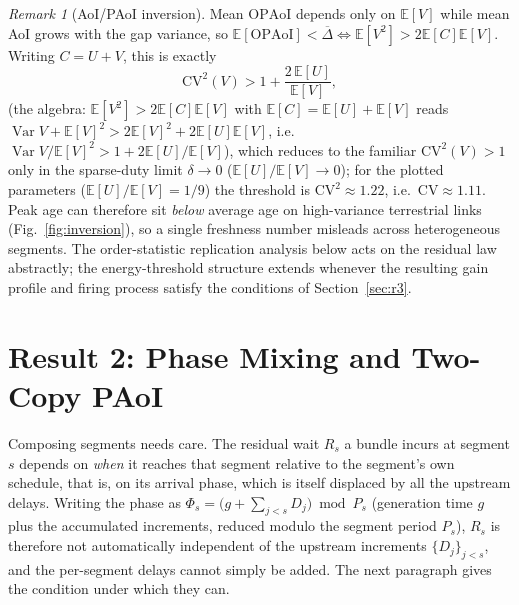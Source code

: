 \documentclass[twocolumn,3p,times,procedia]{elsarticle}
\theoremstyle{plain}
\theoremstyle{remark}
\newtheorem{remark}{Remark}
\newcommand{\AoI}{\Delta}
\newcommand{\OPAoI}{\mathrm{OPAoI}}
\newcommand{\E}{\mathbb{E}}
\begin{document}
\begin{remark}[AoI/PAoI inversion]\label{rem:inversion}
Mean $\OPAoI$ depends only on $\E[V]$ while mean AoI grows with the gap
variance, so
$\E[\OPAoI]<\overline{\AoI}\iff \E[V^2]>2\E[C]\E[V]$. Writing
$C=U+V$, this is exactly
\begin{equation}\label{eq:invcond}
\mathrm{CV}^2(V)>1+\frac{2\,\E[U]}{\E[V]},
\end{equation}
(the algebra: $\E[V^2]>2\E[C]\E[V]$ with $\E[C]=\E[U]+\E[V]$ reads
$\operatorname{Var}V+\E[V]^2>2\E[V]^2+2\E[U]\E[V]$, i.e.\
$\operatorname{Var}V/\E[V]^2>1+2\E[U]/\E[V]$),
which reduces to the familiar $\mathrm{CV}^2(V)>1$ only in the sparse-duty
limit $\delta\to0$ ($\E[U]/\E[V]\to0$); for the plotted parameters
($\E[U]/\E[V]=1/9$) the threshold is $\mathrm{CV}^2\approx1.22$, i.e.\
$\mathrm{CV}\approx1.11$. Peak age can therefore sit
\emph{below} average age on high-variance terrestrial links
(Fig.~\ref{fig:inversion}), so a single freshness number misleads
across heterogeneous segments. The order-statistic replication analysis
below acts on the residual law abstractly; the energy-threshold
structure extends whenever the resulting gain profile and firing
process satisfy the conditions of Section~\ref{sec:r3}.
\end{remark}



\section{Result 2: Phase Mixing and Two-Copy PAoI}\label{sec:r2}
Composing segments needs care. The residual wait $R_s$ a bundle incurs at
segment $s$ depends on \emph{when} it reaches that segment relative to the
segment's own schedule, that is, on its arrival phase, which is itself
displaced by all the upstream delays. Writing the phase as
$\Phi_s=\bigl(g+\sum_{j<s}D_j\bigr)\bmod P_s$ (generation time $g$ plus the
accumulated increments, reduced modulo the segment period $P_s$), $R_s$ is
therefore not automatically independent of the upstream increments
$\{D_j\}_{j<s}$, and the per-segment delays cannot simply be added. The
next paragraph gives the condition under which they can.
\end{document}
